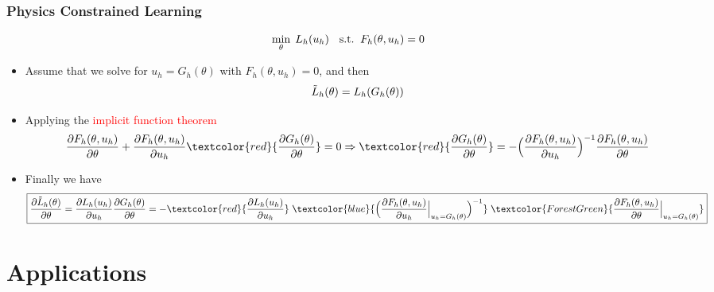\documentclass[usenames,dvipsnames]{beamer}
\begin{document}
\begin{frame}
	\frametitle{Physics Constrained Learning}
	$${\small    \min_{\theta}\; L_h(u_h) \quad \mathrm{s.t.}\;\; F_h(\theta, u_h) = 0}$$
	\begin{itemize}
		\item Assume that we solve for $u_h=G_h(\theta)$ with $F_h(\theta, u_h)=0$, and then
		      $${\small\tilde L_h(\theta)  = L_h(G_h(\theta))}$$
		\item Applying the \textcolor{red}{implicit function theorem}
		      {  \scriptsize
			      \begin{equation*}
				      \frac{{\partial {F_h(\theta, u_h)}}}{{\partial \theta }} + {\frac{{\partial {F_h(\theta, u_h)}}}{{\partial {u_h}}}}
				      \textcolor{red}{\frac{\partial G_h(\theta)}{\partial \theta}}
				      = 0 \Rightarrow
				      \textcolor{red}{\frac{\partial G_h(\theta)}{\partial \theta}} =  -\Big( \frac{{\partial {F_h(\theta, u_h)}}}{{\partial {u_h}}} \Big)^{ - 1} \frac{{\partial {F_h(\theta, u_h)}}}{{\partial \theta }}
			      \end{equation*}
		      }
		\item Finally we have
			      {\scriptsize
				      \begin{equation*}
					      \boxed{\frac{{\partial {{\tilde L}_h}(\theta )}}{{\partial \theta }}
					      = \frac{\partial {{ L}_h}(u_h )}{\partial u_h}\frac{\partial G_h(\theta)}{\partial \theta}=
					      - \textcolor{red}{ \frac{{\partial {L_h}({u_h})}}{{\partial {u_h}}} } \;
					      \textcolor{blue}{ \Big( {\frac{{\partial {F_h(\theta, u_h)}}}{{\partial {u_h}}}\Big|_{u_h = {G_h}(\theta )}} \Big)^{ - 1} } \;
					      \textcolor{ForestGreen}{ \frac{{\partial {F_h(\theta, u_h)}}}{{\partial \theta }}\Big|_{u_h = {G_h}(\theta )} }
					      }
				      \end{equation*}
			      }

	\end{itemize}

\end{frame}



\section{Applications}
\end{document}
